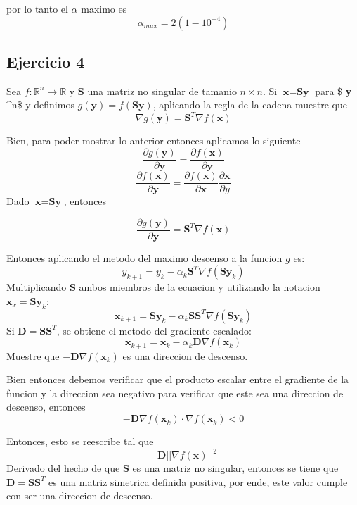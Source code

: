\documentclass[11pt]{article}
\begin{document}
    por lo tanto el \(\alpha\) maximo es \[
    \alpha_{max} = 2(1 - 10^{-4})
\]

    \subsection{Ejercicio 4}\label{ejercicio-4}

    Sea \(f:\mathbb{R}^n \to \mathbb{R}\) y \(\textbf{S}\) una matriz no
singular de tamanio \(n \times n\). Si \(\textbf{x} = \textbf{Sy}\) para
\$ \textbf{y} \in {}\^{}n\$ y definimos
\(g(\textbf{y}) = f(\textbf{Sy})\), aplicando la regla de la cadena
muestre que
\[ \nabla g(\textbf{y}) = \textbf{S}^T \nabla f(\textbf{x})\]

    Bien, para poder mostrar lo anterior entonces aplicamos lo siguiente \[
    \frac{\partial g(\textbf{y})}{\partial \textbf{y}} = \frac{\partial f(\textbf{x})}{\partial \textbf{y}}
\] \[
    \frac{\partial f(\textbf{x})}{\partial \textbf{y}} = \frac{\partial f(\textbf{x})}{\partial \textbf{x}} \frac{\partial \textbf{x}}{\partial y}
\] Dado \(\textbf{x} = \textbf{Sy}\), entonces

    \[
    \frac{\partial g(\textbf{y})}{\partial \textbf{y}} = \textbf{S}^T \nabla f(\textbf{x})
\]

    Entonces aplicando el metodo del maximo descenso a la funcion \(g\) es:
\[
    y_{k+1} = y_k - \alpha_k \textbf{S}^T \nabla f(\textbf{Sy}_k)
\] Multiplicando \(\textbf{S}\) ambos miembros de la ecuacion y
utilizando la notacion \(\textbf{x}_x = \textbf{Sy}_k\): \[
    \textbf{x}_{k+1} = \textbf{Sy}_k - \alpha_k \textbf{SS}^T \nabla f(\textbf{Sy}_k)
\] Si \(\textbf{D} = \textbf{SS}^T\), se obtiene el metodo del gradiente
escalado: \[
    \textbf{x}_{k+1} = \textbf{x}_k - \alpha_k \textbf{D} \nabla f(\textbf{x}_k)
\] Muestre que \(- \textbf{D} \nabla f(\textbf{x}_k)\) es una direccion
de descenso.

    Bien entonces debemos verificar que el producto escalar entre el
gradiente de la funcion y la direccion sea negativo para verificar que
este sea una direccion de descenso, entonces \[
    - \textbf{D} \nabla f(\textbf{x}_k) \cdot \nabla f(\textbf{x}_k) < 0
\]

    Entonces, esto se reescribe tal que \[
    - \textbf{D} || \nabla f(\textbf{x}) ||^2
\] Derivado del hecho de que \(\textbf{S}\) es una matriz no singular,
entonces se tiene que \(\textbf{D} = \textbf{SS}^T\) es una matriz
simetrica definida positiva, por ende, este valor cumple con ser una
direccion de descenso.


    
    
    
\end{document}
